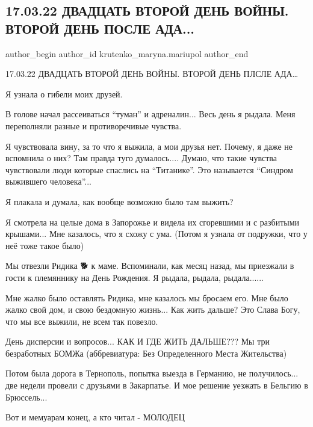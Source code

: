  
 
 
 
 

\subsection{17.03.22 ДВАДЦАТЬ ВТОРОЙ ДЕНЬ ВОЙНЫ. ВТОРОЙ ДЕНЬ ПОСЛЕ АДА...}
\label{sec:17_03_2023.fb.krutenko_maryna.mariupol.1.17_03_22_dvadtsat_vt}

\ifcmt
 author_begin
   author_id krutenko_maryna.mariupol
 author_end
\fi

17.03.22 ДВАДЦАТЬ ВТОРОЙ ДЕНЬ ВОЙНЫ. ВТОРОЙ ДЕНЬ ПЛСЛЕ АДА…

Я узнала о гибели моих друзей.

В голове начал рассеиваться \enquote{туман} и адреналин... Весь день я рыдала. Меня
переполняли разные и противоречивые чувства. 

Я чувствовала вину, за то что я выжила, а мои друзья нет. Почему, я даже не
вспомнила о них? Там правда туго думалось.... Думаю, что такие чувства
чувствовали люди которые спаслись на \enquote{Титанике}. Это называется \enquote{Синдром
выжившего человека}...

Я плакала и думала, как вообще возможно было там выжить? 

Я смотрела на целые дома в Запорожье и видела их сгоревшими и с разбитыми
крышами... Мне казалось, что я схожу с ума. (Потом я узнала от подружки, что у
неё тоже такое было)

Мы отвезли Ридика 🐕 к маме. Вспоминали, как месяц назад, мы приезжали в гости
к племяннику на День Рождения. Я рыдала, рыдала, рыдала......

Мне жалко было оставлять Ридика, мне казалось мы бросаем его. Мне было жалко
свой дом, и свою бездомную жизнь... Как жить дальше? Это Слава Богу, что мы все
выжили, не всем так повезло. 

День дисперсии и вопросов... КАК И ГДЕ ЖИТЬ ДАЛЬШЕ??? Мы три безработных БОМЖа
(аббревиатура: Без Определенного Места Жительства)

Потом была дорога в Тернополь, попытка выезда в Германию, не получилось... две
недели провели с друзьями в Закарпатье. И мое решение уезжать в Бельгию в
Брюссель...

Вот и мемуарам конец, а кто читал - МОЛОДЕЦ

